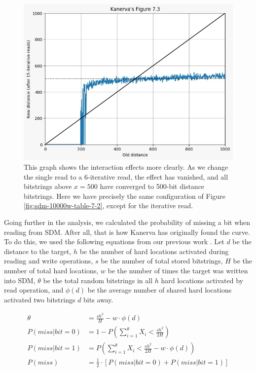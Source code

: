 \begin{figure}[h]
\centering\includegraphics[width=\textwidth]{images02/sdm-10000w-table-7-2-15iter.png}
\caption{This graph shows the interaction effects more clearly.  As we change the single read to a 6-iterative read, the effect has vanished, and all bitstrings above $x=500$ have converged to 500-bit distance bitstrings. Here we have precisely the same configuration of Figure \ref{fig:sdm-10000w-table-7-2}, except for the iterative read.
\label{fig:sdm-10000w-table-7-2-15iter}}
\end{figure}

Going further in the analysis, we calculated the probability of missing a bit when reading from SDM. After all, that is how Kanerva has originally found the curve. To do this, we used the following equations from our previous work \citep{brogliato2014sparse}. Let $d$ be the distance to the target, $h$ be the number of hard locations activated during reading and write operations, $s$ be the number of total stored bitstrings, $H$ be the number of total hard locations, $w$ be the number of times the target was written into SDM, $\theta$ be the total random bitstrings in all $h$ hard locations activated by read operation, and $\phi(d)$ be the average number of shared hard locations activated two bitstrings $d$ bits away.

\begin{align}
\theta &= \frac{sh^2}{H} - w \cdot \phi(d) \\
P(miss | bit=0) &= 1 - P \left( \sum_{i=1}^\theta X_i < \frac{sh^2}{2H} \right) \\
P(miss | bit=1) &= P \left( \sum_{i=1}^\theta X_i < \frac{sh^2}{2H} - w \cdot \phi(d) \right) \\
P(miss) &= \frac{1}{2} \cdot \left[ P(miss | bit=0) + P(miss | bit=1) \right]
\end{align}

